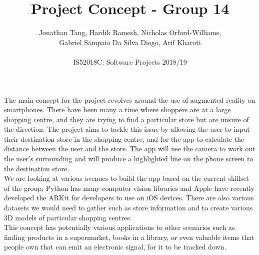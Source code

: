 \documentclass[12pt]{article}
\begin{document}
 
 
 
\title{Project Concept - Group 14}%
\author{Jonathan Tang, Hardik Ramesh, Nicholas Orford-Williams,\\
Gabriel Sampaio Da Silva Diogo, Arif Kharoti\\ %
\\
IS52018C: Software Projects 2018/19} %
 
\maketitle

The main concept for the project revolves around the use of augmented reality on smartphones. There have been many a time where shoppers are at a large shopping centre, and they are trying to find a particular store but are unsure of the direction. The project aims to tackle this issue by allowing the user to input their destination store in the shopping centre, and for the app to calculate the distance between the user and the store. The app will use the camera to work out the user's
surrounding and will produce a highlighted line on the phone screen to the destination store.\\

We are looking at various avenues to build the app based on the current skillset of the group; Python has many computer vision libraries and Apple have recently developed the ARKit for developers to use on iOS devices. There are also various datasets we would need to gather such as store information and to create various 3D models of particular shopping centres.\\

This concept has potentially various applications to other scenarios such as finding products in a supermarket, books in a library, or even valuable items that people own that can emit an electronic signal, for it to be tracked down.

 
\end{document}
